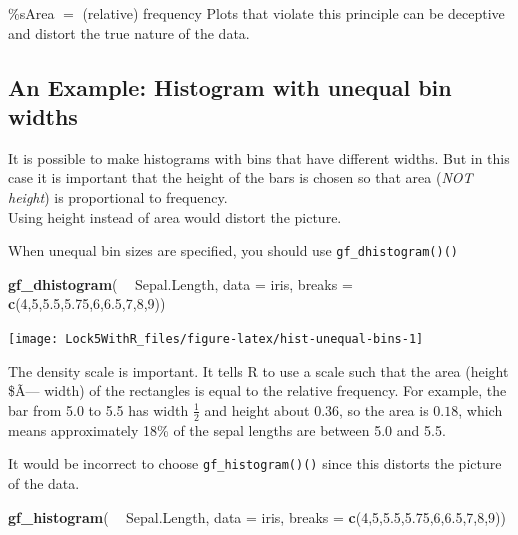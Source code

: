 \documentclass[]{book}
\newenvironment{Shaded}{\begin{snugshade}}{\end{snugshade}}
\newcommand{\DataTypeTok}[1]{\textcolor[rgb]{0.13,0.29,0.53}{#1}}
\newcommand{\DecValTok}[1]{\textcolor[rgb]{0.00,0.00,0.81}{#1}}
\newcommand{\FloatTok}[1]{\textcolor[rgb]{0.00,0.00,0.81}{#1}}
\newcommand{\KeywordTok}[1]{\textcolor[rgb]{0.13,0.29,0.53}{\textbf{#1}}}
\newcommand{\NormalTok}[1]{#1}
\newcommand{\OperatorTok}[1]{\textcolor[rgb]{0.81,0.36,0.00}{\textbf{#1}}}
\newcommand{\StringTok}[1]{\textcolor[rgb]{0.31,0.60,0.02}{#1}}
\begin{document}
{\%s}Area \(=\) (relative) frequency
Plots that violate this principle can be deceptive and distort the true nature
of the data.

\hypertarget{an-example-histogram-with-unequal-bin-widths}{%
\subsection{An Example: Histogram with unequal bin widths}\label{an-example-histogram-with-unequal-bin-widths}}

It is possible to make histograms with bins that have different widths.
But in this case it is important that the height of the bars is chosen so
that area (\emph{NOT height}) is proportional to frequency.\\
Using height instead of area would distort the picture.

When unequal bin sizes are specified, you should use \texttt{gf\_dhistogram()()}

\begin{Shaded}
\begin{Highlighting}[]
\KeywordTok{gf_dhistogram}\NormalTok{( }\OperatorTok{~}\StringTok{ }\NormalTok{Sepal.Length, }\DataTypeTok{data =}\NormalTok{ iris, }\DataTypeTok{breaks =} \KeywordTok{c}\NormalTok{(}\DecValTok{4}\NormalTok{,}\DecValTok{5}\NormalTok{,}\FloatTok{5.5}\NormalTok{,}\FloatTok{5.75}\NormalTok{,}\DecValTok{6}\NormalTok{,}\FloatTok{6.5}\NormalTok{,}\DecValTok{7}\NormalTok{,}\DecValTok{8}\NormalTok{,}\DecValTok{9}\NormalTok{))}
\end{Highlighting}
\end{Shaded}

\texttt{[image: Lock5WithR\_files/figure-latex/hist-unequal-bins-1]}

The density scale is important.
It tells R to use a scale such that
the area (height \$Ã--- width) of the rectangles is equal to the relative frequency.
For example, the bar from 5.0 to 5.5 has width \(\frac12\) and height about \(0.36\), so
the area is \(0.18\), which means approximately 18\% of the sepal lengths are
between 5.0 and 5.5.

It would be incorrect to choose \texttt{gf\_histogram()()} since
this distorts the picture of the data.

\begin{Shaded}
\begin{Highlighting}[]
\KeywordTok{gf_histogram}\NormalTok{( }\OperatorTok{~}\StringTok{ }\NormalTok{Sepal.Length, }\DataTypeTok{data =}\NormalTok{ iris, }\DataTypeTok{breaks =} \KeywordTok{c}\NormalTok{(}\DecValTok{4}\NormalTok{,}\DecValTok{5}\NormalTok{,}\FloatTok{5.5}\NormalTok{,}\FloatTok{5.75}\NormalTok{,}\DecValTok{6}\NormalTok{,}\FloatTok{6.5}\NormalTok{,}\DecValTok{7}\NormalTok{,}\DecValTok{8}\NormalTok{,}\DecValTok{9}\NormalTok{))}
\end{Highlighting}
\end{Shaded}
\end{document}
